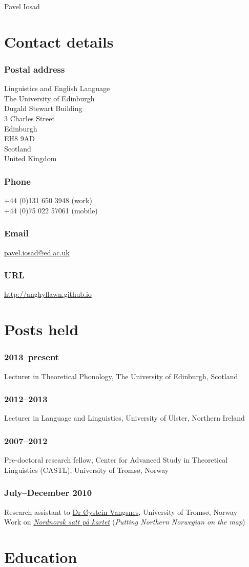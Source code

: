 \documentclass[a4paper,12pt]{article}
\newlength\blockwidth
\newcommand\cvitem[1]{\hspace*{\blockwidth}\begin{minipage}[t]{\linewidth-\blockwidth}
#1
\end{minipage}\par}
\newcommand{\block}[2]{\subsubsection{#1}\cvitem{#2}}
\begin{document}
\thispagestyle{plain}
{\Huge Pavel Iosad}\\[\baselineskip]

\section{Contact details}

\raggedcolumns

\begin{multicols}{2}
\block{Postal address}{Linguistics and English Language\\
The University of Edinburgh\\
Dugald Stewart Building\\
3 Charles Street\\
Edinburgh\\
EH8 9AD\\
Scotland\\
United Kingdom}
\block{Phone}{+44 (0)131 650 3948 (work)\\
+44 (0)75 022 57061 (mobile)}
\block{Email}{\href{mailto:pavel.iosad@ed.ac.uk}{pavel.iosad@ed.ac.uk}}
\block{URL}{\href{http://anghyflawn.github.io}{http://anghyflawn.github.io}}
\end{multicols}

\section{Posts held}
\block{2013--present}{Lecturer in Theoretical Phonology, The University of Edinburgh, Scotland}
\block{2012--2013}{Lecturer in Language and Linguistics, University of Ulster, Northern Ireland}
\block{2007--2012}{Pre-doctoral research fellow, Center for Advanced Study in Theoretical Linguistics (CASTL), University of Tromsø, Norway}
\block{July--December 2010}{Research assistant to \href{http://www.hum.uit.no/a/vangsnes}{Dr Øystein Vangsnes}, University of Tromsø, Norway\\
Work on \href{http://nordnorsk.uit.no/}{\textit{Nordnorsk satt på kartet}} (\textit{Putting Northern Norwegian on the map})}

\section{Education}
\end{document}
